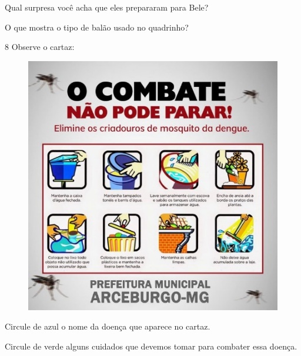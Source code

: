 \begin{escolha}
\item Qual surpresa você acha que eles prepararam para Bele?


\item O que mostra o tipo de balão usado no quadrinho?

\end{escolha}

\pagebreak
\num{8} Observe o cartaz:

\begin{figure}[htpb!]
\centering
\includegraphics[width=\textwidth]{media/image134.jpeg}
\end{figure}


\begin{escolha}
\item Circule de azul o nome da doença que aparece no cartaz.

\item Circule de verde alguns cuidados que devemos tomar para combater essa doença.
\end{escolha}

